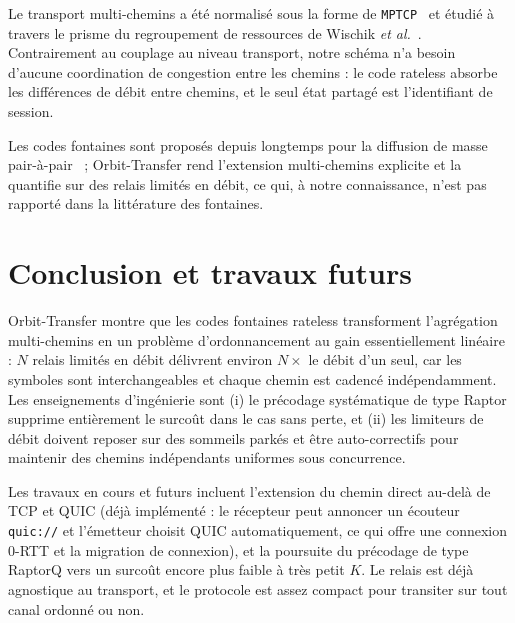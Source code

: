 \documentclass[conference]{IEEEtran}
\begin{document}
Le transport multi-chemins a été normalisé sous la forme de
\texttt{MPTCP}~\cite{rfc6824} et étudié à travers le prisme du regroupement de
ressources de Wischik \emph{et al.}~\cite{wischik2008survey}. Contrairement au
couplage au niveau transport, notre schéma n'a besoin d'aucune coordination de
congestion entre les chemins : le code rateless absorbe les différences de
débit entre chemins, et le seul état partagé est l'identifiant de session.

Les codes fontaines sont proposés depuis longtemps pour la diffusion de masse
pair-à-pair~\cite{maymounkov2002online} ; Orbit-Transfer rend l'extension
multi-chemins explicite et la quantifie sur des relais limités en débit, ce qui,
à notre connaissance, n'est pas rapporté dans la littérature des fontaines.

\section{Conclusion et travaux futurs}
Orbit-Transfer montre que les codes fontaines rateless transforment
l'agrégation multi-chemins en un problème d'ordonnancement au gain
essentiellement linéaire : $N$ relais limités en débit délivrent environ
$N\times$ le débit d'un seul, car les symboles sont interchangeables et chaque
chemin est cadencé indépendamment. Les enseignements d'ingénierie sont (i) le
précodage systématique de type Raptor supprime entièrement le surcoût dans le
cas sans perte, et (ii) les limiteurs de débit doivent reposer sur des sommeils
parkés et être auto-correctifs pour maintenir des chemins indépendants
uniformes sous concurrence.

Les travaux en cours et futurs incluent l'extension du chemin direct au-delà de
TCP et QUIC (déjà implémenté : le récepteur peut annoncer un écouteur
\texttt{quic://} et l'émetteur choisit QUIC automatiquement, ce qui offre une
connexion 0-RTT et la migration de connexion), et la poursuite du précodage de
type RaptorQ vers un surcoût encore plus faible à très petit $K$. Le relais est
déjà agnostique au transport, et le protocole est assez compact pour transiter
sur tout canal ordonné ou non.
\end{document}
